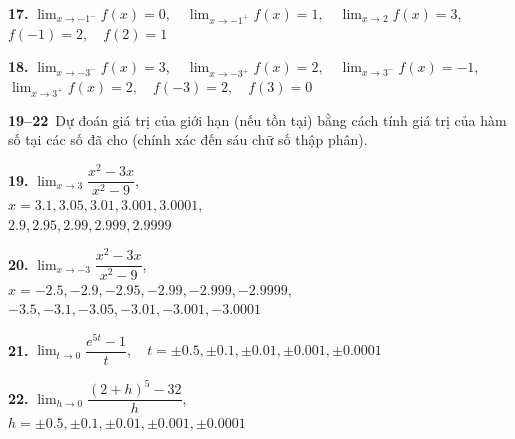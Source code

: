 \begin{minipage}[t]{0.482\textwidth}
  \noindent
  \textbf{17.} $\lim_{x \to -1^-} f(x) = 0, \quad \lim_{x \to -1^+} f(x) = 1, \quad \lim_{x \to 2} f(x) = 3,$ \\[0.25em]
  $f(-1) = 2, \quad f(2) = 1$

  \vspace{0.45em}
  \noindent
  \textbf{18.} $\lim_{x \to -3^-} f(x) = 3, \quad \lim_{x \to -3^+} f(x) = 2, \quad \lim_{x \to 3^-} f(x) = -1,$ \\[0.25em]
  $\lim_{x \to 3^+} f(x) = 2, \quad f(-3) = 2, \quad f(3) = 0$

  \vspace{0.4em}
  \noindent{\color{stewartrule}\rule{\linewidth}{0.55pt}}
  \vspace{0.25em}

  \noindent
  \textbf{\textsf{\color{stewartcyan}19--22}}\ Dự đoán giá trị của giới hạn (nếu tồn tại) bằng cách tính giá trị của hàm số tại các số đã cho (chính xác đến sáu chữ số thập phân).

  \vspace{0.35em}
  \noindent
  \textbf{19.} $\lim_{x \to 3} \dfrac{x^2 - 3x}{x^2 - 9}$, \\[0.2em]
  $x = 3.1, 3.05, 3.01, 3.001, 3.0001,$ \\[0.15em]
  $2.9, 2.95, 2.99, 2.999, 2.9999$

  \vspace{0.35em}
  \noindent
  \textbf{20.} $\lim_{x \to -3} \dfrac{x^2 - 3x}{x^2 - 9}$, \\[0.2em]
  $x = -2.5, -2.9, -2.95, -2.99, -2.999, -2.9999,$ \\[0.15em]
  $-3.5, -3.1, -3.05, -3.01, -3.001, -3.0001$

  \vspace{0.35em}
  \noindent
  \textbf{21.} $\lim_{t \to 0} \dfrac{e^{5t} - 1}{t}, \quad t = \pm 0.5, \pm 0.1, \pm 0.01, \pm 0.001, \pm 0.0001$

  \vspace{0.35em}
  \noindent
  \textbf{22.} $\lim_{h \to 0} \dfrac{(2 + h)^5 - 32}{h}$, \\[0.2em]
  $h = \pm 0.5, \pm 0.1, \pm 0.01, \pm 0.001, \pm 0.0001$

  \vspace{0.4em}
  \noindent{\color{stewartrule}\rule{\linewidth}{0.55pt}}
  \vspace{0.25em}


\end{minipage}
